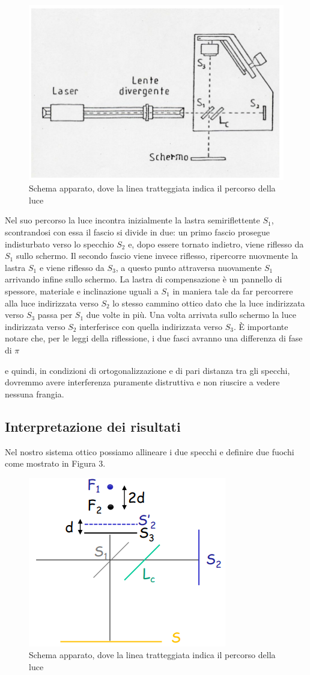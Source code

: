 \documentclass{article}
\begin{document}
\begin{figure}[h!]
  \centering
  \includegraphics[width=0.7\linewidth]{IM percorso luce}
  \caption{Schema apparato, dove la linea tratteggiata indica il percorso della luce}
\end{figure}


Nel suo percorso la luce incontra inizialmente la lastra semiriflettente $S_1$, scontrandosi con essa il fascio si divide in due: un primo fascio prosegue indisturbato verso lo specchio $S_2$ e, dopo essere tornato indietro, viene riflesso da $S_1$ sullo schermo. Il secondo fascio viene invece riflesso, ripercorre nuovmente la lastra $S_1$ e viene riflesso da $S_3$, a questo punto attraversa nuovamente $S_1$ arrivando infine sullo schermo. La lastra di compensazione è un pannello di spessore, materiale e inclinazione uguali a $S_1$ in maniera tale da far percorrere alla luce indirizzata verso $S_2$ lo stesso cammino ottico dato che la luce indirizzata verso $S_3$ passa per $S_1$ due volte in più.
Una volta arrivata sullo schermo la luce indirizzata verso $S_2$ interferisce con quella indirizzata verso $S_3$. È importante notare che, per le leggi della riflessione, i due fasci avranno una differenza di fase di $\pi$  e quindi, in condizioni di ortogonalizzazione e di pari distanza tra gli specchi, dovremmo avere interferenza puramente distruttiva e non riuscire a vedere nessuna frangia.


\subsection{Interpretazione dei risultati}
Nel nostro sistema ottico possiamo allineare i due specchi e definire due fuochi come mostrato in Figura 3.

\begin{figure}[h!]
  \centering
  \includegraphics[width=0.3\linewidth]{IM fuochi}
  \caption{Schema apparato, dove la linea tratteggiata indica il percorso della luce}
\end{figure}
\end{document}
